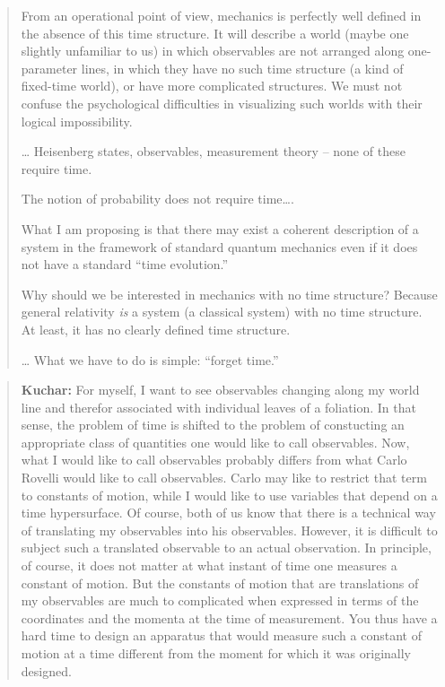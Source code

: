 \documentclass{article}
\begin{document}
\begin{quote}
From an operational point of view, mechanics is perfectly well defined
in the absence of this time structure. It will describe a world (maybe
one slightly unfamiliar to us) in which observables are not arranged
along one-parameter lines, in which they have no such time structure (a
kind of fixed-time world), or have more complicated structures. We must
not confuse the psychological difficulties in visualizing such worlds
with their logical impossibility.

\ldots{} Heisenberg states, observables, measurement theory -- none of
these require time.

The notion of probability does not require time\ldots.

What I am proposing is that there may exist a coherent description of a
system in the framework of standard quantum mechanics even if it does
not have a standard ``time evolution.''

Why should we be interested in mechanics with no time structure? Because
general relativity \emph{is} a system (a classical system) with no time
structure. At least, it has no clearly defined time structure.

\ldots{} What we have to do is simple: ``forget time.''
\end{quote}

\begin{quote}
\textbf{Kuchar:} For myself, I want to see observables changing along my
world line and therefor associated with individual leaves of a
foliation. In that sense, the problem of time is shifted to the problem
of constucting an appropriate class of quantities one would like to call
observables. Now, what I would like to call observables probably differs
from what Carlo Rovelli would like to call observables. Carlo may like
to restrict that term to constants of motion, while I would like to use
variables that depend on a time hypersurface. Of course, both of us know
that there is a technical way of translating my observables into his
observables. However, it is difficult to subject such a translated
observable to an actual observation. In principle, of course, it does
not matter at what instant of time one measures a constant of motion.
But the constants of motion that are translations of my observables are
much to complicated when expressed in terms of the coordinates and the
momenta at the time of measurement. You thus have a hard time to design
an apparatus that would measure such a constant of motion at a time
different from the moment for which it was originally designed.
\end{quote}
\end{document}
